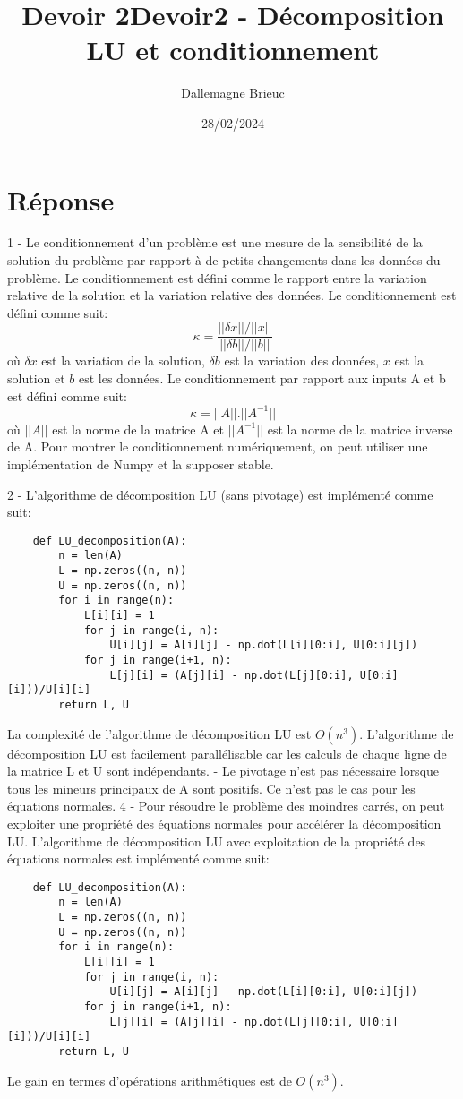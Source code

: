 \documentclass[12pt]{article}
\title{Devoir 2}
\author{Dallemagne Brieuc}
\date{28/02/2024}
\begin{document}
\title{Devoir2 - Décomposition LU et conditionnement}

\section{Réponse}
1 - Le conditionnement d'un problème est une mesure de la sensibilité de la solution du problème par rapport à de petits 
changements dans les données du problème. Le conditionnement est défini comme le rapport entre la variation relative de la solution et
 la variation relative des données. Le conditionnement est défini comme suit: 
\begin{equation}
    \kappa = \frac{||\delta x||/||x||}{||\delta b||/||b||}
\end{equation}
où $\delta x$ est la variation de la solution, $\delta b$ est la variation des données, $x$ est la solution et $b$ est les données.
Le conditionnement par rapport aux inputs A et b est défini comme suit:
\begin{equation}
    \kappa = ||A||.||A^{-1}||
\end{equation}
où $||A||$ est la norme de la matrice A et $||A^{-1}||$ est la norme de la matrice inverse de A.
Pour montrer le conditionnement numériquement, on peut utiliser une implémentation de Numpy et la supposer stable.



2 - L'algorithme de décomposition LU (sans pivotage) est implémenté comme suit:
\begin{lstlisting}
    def LU_decomposition(A):
        n = len(A)
        L = np.zeros((n, n))
        U = np.zeros((n, n))
        for i in range(n):
            L[i][i] = 1
            for j in range(i, n):
                U[i][j] = A[i][j] - np.dot(L[i][0:i], U[0:i][j])
            for j in range(i+1, n):
                L[j][i] = (A[j][i] - np.dot(L[j][0:i], U[0:i][i]))/U[i][i]
        return L, U
\end{lstlisting}
La complexité de l'algorithme de décomposition LU est $O(n^3)$.
L'algorithme de décomposition LU est facilement parallélisable car les calculs de chaque ligne de la matrice L et U sont indépendants.
 - Le pivotage n'est pas nécessaire lorsque tous les mineurs principaux de A sont positifs. Ce n'est pas le cas pour les équations normales.
4 - Pour résoudre le problème des moindres carrés, on peut exploiter une propriété des équations normales pour accélérer la décomposition LU.
L'algorithme de décomposition LU avec exploitation de la propriété des équations normales est implémenté comme suit:
\begin{lstlisting}
    def LU_decomposition(A):
        n = len(A)
        L = np.zeros((n, n))
        U = np.zeros((n, n))
        for i in range(n):
            L[i][i] = 1
            for j in range(i, n):
                U[i][j] = A[i][j] - np.dot(L[i][0:i], U[0:i][j])
            for j in range(i+1, n):
                L[j][i] = (A[j][i] - np.dot(L[j][0:i], U[0:i][i]))/U[i][i]
        return L, U
\end{lstlisting}
Le gain en termes d'opérations arithmétiques est de $O(n^3)$.
\end{document}
